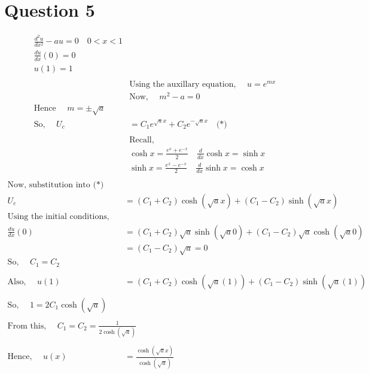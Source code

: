 \documentclass[letterpaper,12pt,titlepage,oneside,final]{book}
\begin{document}
\section*{Question 5}
\begin{align*}
\frac{d^2u}{dx^2} -au = 0 \quad 0 < x < 1 \\
\frac{du}{dx} (0) = 0\\
u(1) = 1\\
\\
&\text{Using the auxillary equation, }\quad u = e^{mx}\\
&\text{Now, }\quad m^2 - a = 0\\
\text{Hence }\quad m = \pm \sqrt{a}\\
\text{So, }\quad U_c &= C_1 e^{\sqrt{a} x} + C_2e^{-\sqrt{a} x} \quad \text{(*)}\\
\\
&\text{Recall, }\\
&\cosh x = \frac{e^x + e^{-x}}{2}\quad \frac{d}{dx} \cosh x = \sinh x\\
&\sinh x = \frac{e^x - e^{-x}}{2} \quad \frac{d}{dx} \sinh x = \cosh x\\
\end{align*}
\begin{align*}
\text{Now, substitution into (*)}\\
U_c & = \left( C_1 + C_2 \right)\cosh (\sqrt{a}x) + \left( C_1 - C_2 \right)\sinh (\sqrt{a}x)\\
\text{Using the initial conditions, }\\
\frac{du}{dx}(0) &= \left( C_1 + C_2 \right) \sqrt{a}\sinh (\sqrt{a}0) + \left( C_1 - C_2 \right) \sqrt{a}\cosh (\sqrt{a}0)\\
&=\left( C_1 - C_2 \right)\sqrt{a} = 0\\
\text{So, } \quad C_1 = C_2\\
\\
\text{Also, }\quad u(1) &= \left( C_1 + C_2 \right)\cosh (\sqrt{a}(1)) + \left( C_1 - C_2 \right)\sinh (\sqrt{a}(1))\\
\\
\text{So, }\quad 1 = 2C_1\cosh(\sqrt{a})\\
\\
\text{From this, }\quad C_1 = C_2 = \frac{1}{2\cosh(\sqrt{a})}\\
\\
\text{Hence, }\quad
u(x) & = \frac{\cosh(\sqrt{a}x)}{\cosh(\sqrt{a})}
\end{align*}
\end{document}
